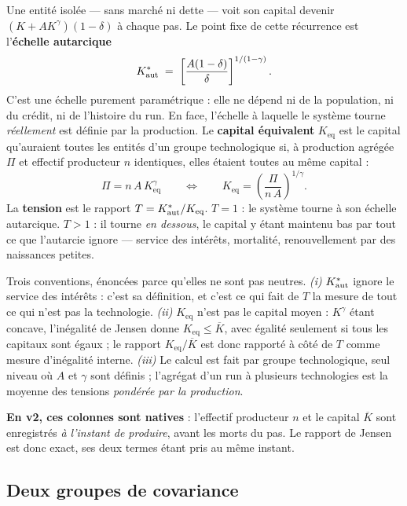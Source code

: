Une entité isolée --- sans marché ni dette --- voit son capital devenir
$(K + A K^{\gamma})(1-\delta)$ à chaque pas. Le point fixe de cette
récurrence est l'\textbf{échelle autarcique}
\begin{equation}
K^{*}_{\mathrm{aut}} \;=\; \left[\frac{A(1-\delta)}{\delta}\right]^{1/(1-\gamma)} .
\label{eq:kaut}
\end{equation}
C'est une échelle purement paramétrique : elle ne dépend ni de la population,
ni du crédit, ni de l'histoire du run. En face, l'échelle à laquelle le
système tourne \emph{réellement} est définie par la production. Le
\textbf{capital équivalent} $K_{\text{eq}}$ est le capital qu'auraient toutes
les entités d'un groupe technologique si, à production agrégée $\Pi$ et
effectif producteur $n$ identiques, elles étaient toutes au même capital :
\begin{equation}
\Pi = n\,A\,K_{\text{eq}}^{\gamma}
\qquad\Longleftrightarrow\qquad
K_{\text{eq}} = \left(\frac{\Pi}{n\,A}\right)^{1/\gamma} .
\label{eq:keq}
\end{equation}
La \textbf{tension} est le rapport $T = K^{*}_{\mathrm{aut}}/K_{\text{eq}}$. $T = 1$ : le
système tourne à son échelle autarcique. $T > 1$ : il tourne \emph{en
dessous}, le capital y étant maintenu bas par tout ce que l'autarcie ignore
--- service des intérêts, mortalité, renouvellement par des naissances
petites.

Trois conventions, énoncées parce qu'elles ne sont pas neutres.
\emph{(i)} $K^{*}_{\mathrm{aut}}$ ignore le service des intérêts : c'est sa définition, et
c'est ce qui fait de $T$ la mesure de tout ce qui n'est pas la technologie.
\emph{(ii)} $K_{\text{eq}}$ n'est pas le capital moyen : $K^{\gamma}$ étant
concave, l'inégalité de Jensen donne $K_{\text{eq}} \le \overline{K}$, avec
égalité seulement si tous les capitaux sont égaux ; le rapport
$K_{\text{eq}}/\overline{K}$ est donc rapporté à côté de $T$ comme mesure
d'inégalité interne. \emph{(iii)} Le calcul est fait par groupe
technologique, seul niveau où $A$ et $\gamma$ sont définis ; l'agrégat d'un
run à plusieurs technologies est la moyenne des tensions \emph{pondérée par
la production}.

\textbf{En v2, ces colonnes sont natives} : l'effectif producteur $n$ et le
capital $\overline{K}$ sont enregistrés \emph{à l'instant de produire}, avant
les morts du pas. Le rapport de Jensen est donc exact, ses deux termes étant
pris au même instant.

\subsection{Deux groupes de covariance}
\label{sec:covariance}

